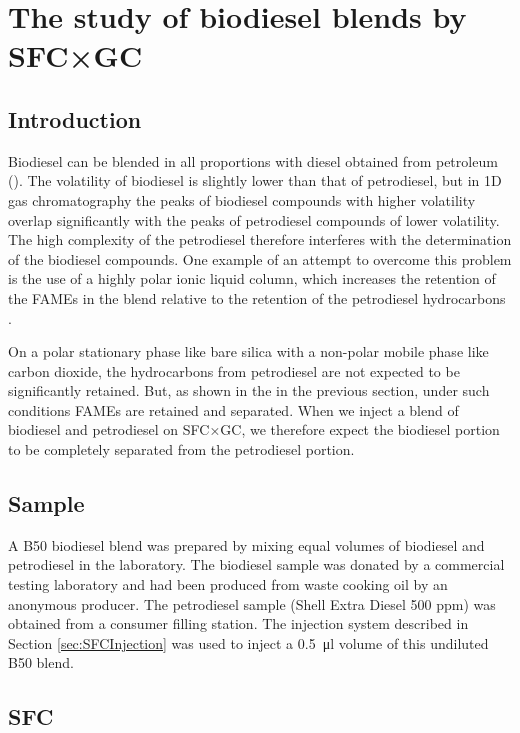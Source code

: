 \section{The study of biodiesel blends by SFC×GC}

\subsection{Introduction}
Biodiesel can be blended in all proportions with diesel obtained from petroleum
(). The volatility of biodiesel is slightly lower than that
of petrodiesel, but in 1D gas chromatography the peaks of biodiesel compounds
with higher volatility overlap significantly with the peaks of petrodiesel
compounds of lower volatility. The high complexity of the petrodiesel therefore
interferes with the determination of the biodiesel compounds. One example of an
attempt to overcome this problem is the use of a highly polar ionic liquid
column, which increases the retention of the FAMEs in the blend relative to the
retention of the petrodiesel hydrocarbons \autocite{Ragonese2009}.

On a polar stationary phase like bare silica with a non-polar mobile phase
like carbon dioxide, the hydrocarbons from petrodiesel are not expected to be
significantly retained. But, as shown in the in the previous section, under such
conditions FAMEs are retained and separated. When we inject a blend of biodiesel
and petrodiesel on SFC×GC, we therefore expect the biodiesel portion to be
completely separated from the petrodiesel portion.

\subsection{Sample}

A B50 biodiesel blend was prepared by mixing equal volumes of biodiesel and
petrodiesel in the laboratory. The biodiesel sample was donated by a commercial
testing laboratory and had been produced from waste cooking oil by an anonymous
producer. The petrodiesel sample (Shell Extra Diesel 500 ppm) was obtained from
a consumer filling station. The injection system described in Section
\ref{sec:SFCInjection} was used to inject a \SI{0.5}{\micro\litre} volume of
this undiluted B50 blend.

\subsection{SFC}

